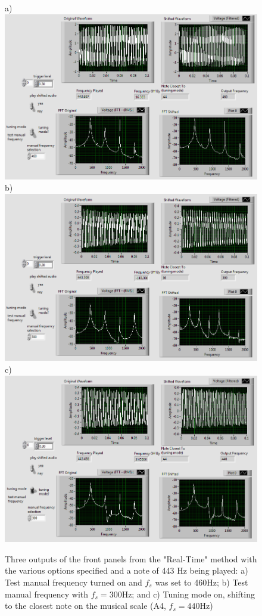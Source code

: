 \documentclass{article}
\begin{document}
    \begin{figure}[H]
            \centering
            a)\includegraphics[scale=0.4]{front1.png}
            b)\includegraphics[scale=0.4]{front2.png}
            c)\includegraphics[scale=0.4]{front3.png}
            \caption{Three outputs of the front panels from the "Real-Time" method with the various options specified and a note of 443 Hz being played: a) Test manual frequency turned on and $f_s$ was set to 460Hz; b) Test manual frequency with $f_s = 300$Hz; and c) Tuning mode on, shifting to the closest note on the musical scale (A4, $f_s = 440$Hz)}
            \label{fig:my_label}
        \end{figure}
\end{document}
